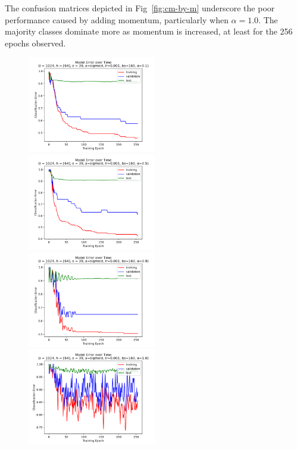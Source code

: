 \documentclass[10pt,epsf]{article}
\begin{document}
{{{      The confusion matrices depicted in Fig~\ref{fig:cm-by-m} underscore the poor performance
      caused by adding momentum, particularly when $\alpha = 1.0$. The majority classes dominate
      more as momentum is increased, at least for the 256 epochs observed.
    }
    \begin{figure}[H]
      \includegraphics[width=0.5\textwidth]{./img/64-0.001-160-0.1-sigmoid-1/error-255.png}
      \includegraphics[width=0.5\textwidth]{./img/64-0.001-160-0.5-sigmoid-1/error-255.png}
      \includegraphics[width=0.5\textwidth]{./img/64-0.001-160-0.9-sigmoid-1/error-255.png}
      \includegraphics[width=0.5\textwidth]{./img/64-0.001-160-1-sigmoid-1/error-255.png}

\end{figure}}}
\end{document}
